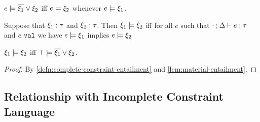 \begin{lemma}
  \label{lem:material-entailment}
  $e \models \overline{\xi_1} \vee \xi_2$ iff $e \models \xi_2$ whenever $e \models \xi_1$.
\end{lemma}

\begin{definition}
  \label{defn:complete-constraint-entailment}
  Suppose that $\xi_1 : \tau$ and $\xi_2 : \tau$.
  Then $\xi_1 \models \xi_2$ iff for all $e$ such that $\cdot \mathbin{;} \Delta \vdash e : \tau$ and $e ~\mathtt{val}$ we have $e \models \xi_1$ implies $e \models \xi_2$
\end{definition}

\begin{corollary}
\label{corol:material-entailment}
  $\xi_1 \models \xi_2$ iff $\top \models \overline{\xi_1} \vee \xi_2$.
\end{corollary}
\begin{proof}
  By \autoref{defn:complete-constraint-entailment} and \autoref{lem:material-entailment}.
\end{proof}

\subsection{Relationship with Incomplete Constraint Language}

